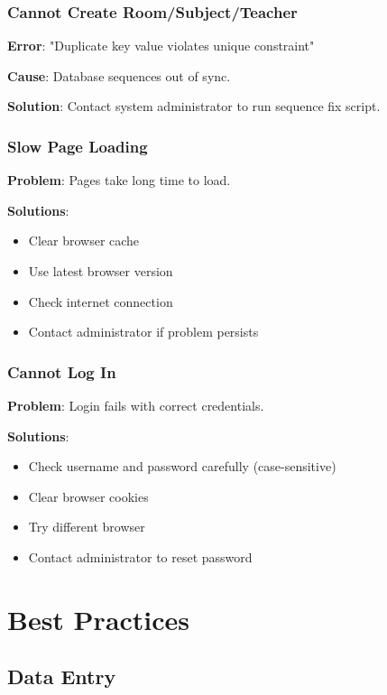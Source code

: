 \documentclass[12pt,a4paper]{article}
\begin{document}
\subsubsection{Cannot Create Room/Subject/Teacher}

\textbf{Error}: "Duplicate key value violates unique constraint"

\textbf{Cause}: Database sequences out of sync.

\textbf{Solution}: Contact system administrator to run sequence fix script.

\subsubsection{Slow Page Loading}

\textbf{Problem}: Pages take long time to load.

\textbf{Solutions}:
\begin{itemize}
\item Clear browser cache
\item Use latest browser version
\item Check internet connection
\item Contact administrator if problem persists
\end{itemize}

\subsubsection{Cannot Log In}

\textbf{Problem}: Login fails with correct credentials.

\textbf{Solutions}:
\begin{itemize}
\item Check username and password carefully (case-sensitive)
\item Clear browser cookies
\item Try different browser
\item Contact administrator to reset password
\end{itemize}

\section{Best Practices}

\subsection{Data Entry}
\end{document}
